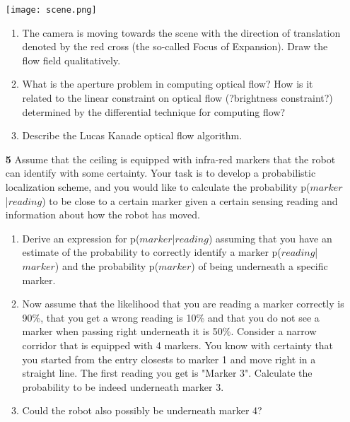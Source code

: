 \documentclass[11pt]{article}
\begin{document}
\begin{enumerate}
		\texttt{[image: scene.png]}
		\begin{enumerate} 
			\item The camera is moving towards the scene with the direction of translation denoted by the red
			cross (the so-called Focus of Expansion). Draw the flow field qualitatively.		
			
			\item What is the aperture problem in computing optical flow? How is it related to the linear
			constraint on optical flow (?brightness constraint?) determined by the differential technique for
			computing flow?
			
			\item Describe the Lucas Kanade optical flow algorithm.
		\end{enumerate}
		
	\item[\textbf{5}] 
		Assume that the ceiling is equipped with infra-red markers that the robot can identify with
		some certainty. Your task is to develop a probabilistic localization scheme, and you would like
		to calculate the probability p($marker$|$reading$) to be close to a certain marker given a certain
		sensing reading and information about how the robot has moved. 	
		
		\begin{enumerate} 
			\item Derive an expression
				for p($marker$|$reading$) assuming that you have an estimate of the probability to correctly identify
				a marker p($reading$|$marker$) and the probability p($marker$) of being underneath a specific
				marker.
				
			\item Now assume that the likelihood that you are reading a marker correctly is 90\%, that you
			get a wrong reading is 10\% and that you do not see a marker when passing right underneath it is  			50\%. Consider a narrow corridor that is equipped with 4 markers. You know
			with certainty that you started from the entry closests to marker 1 and move right in a straight
			line. The first reading you get is "Marker 3". Calculate the probability to be indeed underneath
			marker 3.
			
			\item Could the robot also possibly be underneath marker 4?
		\end{enumerate}
	\end{enumerate}	
\end{document}
